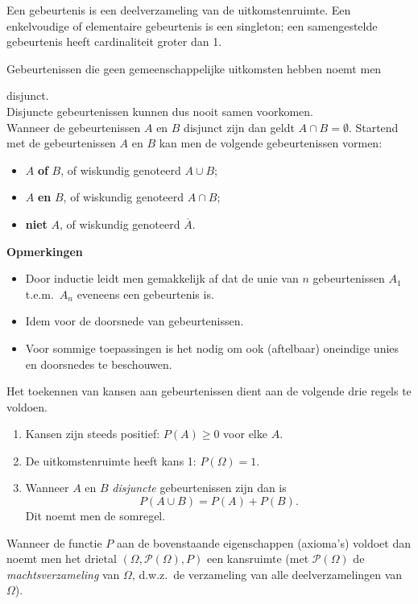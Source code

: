 \begin{definition}[Gebeurtenis]
 Een gebeurtenis is een deelverzameling van de uitkomstenruimte. Een enkelvoudige of elementaire gebeurtenis is een singleton;   een samengestelde gebeurtenis heeft cardinaliteit groter dan 1.
\end{definition}
Gebeurtenissen die geen gemeenschappelijke uitkomsten hebben noemt men
{disjunct. \\
Disjuncte gebeurtenissen kunnen dus nooit samen voorkomen.\\
Wanneer de gebeurtenissen $A$ en $B$ disjunct zijn dan geldt
$A \cap B = \emptyset$.
Startend met
 de gebeurtenissen $A$ en $B$ kan men de volgende gebeurtenissen vormen:
 \begin{itemize}
  \item $A$ \textbf{of} $B$, of wiskundig genoteerd $A \cup B$;
  \item $A$ \textbf{en} $B$, of wiskundig genoteerd $A \cap B$;
  \item \textbf{niet} $A$, of wiskundig genoteerd $\overline{A}$.
\end{itemize}
\textbf{Opmerkingen}
\begin{itemize}
\item Door inductie leidt men gemakkelijk  af dat
de unie van $n$  gebeurtenissen $A_1$ t.e.m.~$A_n$ eveneens
een gebeurtenis is.
\item Idem voor de doorsnede van
gebeurtenissen.
\item Voor sommige toepassingen is het nodig om ook (aftelbaar) oneindige
unies en doorsnedes te beschouwen.
\end{itemize}

\begin{definition}[Kansruimte]
Het toekennen van kansen aan gebeurtenissen dient aan de volgende drie regels te voldoen.
\begin{enumerate}
\item Kansen zijn steeds positief:
 $P(A) \geq 0$ voor elke $A$.
  \item
  De uitkomstenruimte heeft kans 1:
  $P(\Omega) = 1.$
 \item Wanneer $A$ en $B$ \emph{disjuncte}\/ gebeurtenissen zijn dan is
 \[P(A\cup B) = P(A) + P(B). \]
 Dit noemt men de somregel.
\end{enumerate}
Wanneer de functie $P$ aan de bovenstaande eigenschappen (axioma's) voldoet
dan noemt men het drietal $(\Omega, \mathcal{P}(\Omega), P)$ een
kansruimte (met $\mathcal{P}(\Omega)$ de \emph{machtsverzameling} van $\Omega$, d.w.z.~de verzameling van alle deelverzamelingen van $\Omega$).
\end{definition}

}
